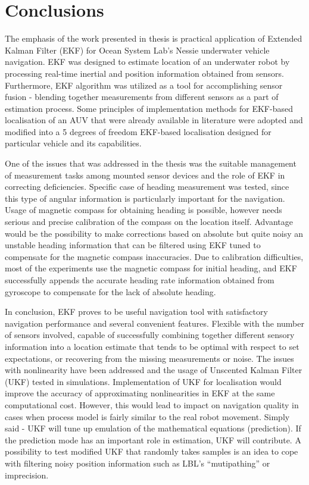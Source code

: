 \chapter{Conclusions} \label{chap:conclusions}
The emphasis of the work presented in thesis is practical application of Extended Kalman Filter (EKF) for Ocean System Lab's Nessie underwater vehicle navigation. EKF was designed to estimate location of an underwater robot by processing real-time inertial and position information obtained from sensors. Furthermore, EKF algorithm was utilized as a tool for accomplishing sensor fusion - blending together measurements from different sensors as a part of estimation process. Some principles of implementation methods for EKF-based localisation of an AUV that were already available in literature were adopted and modified into a 5 degrees of freedom EKF-based localisation designed for particular vehicle and its capabilities.  

One of the issues that was addressed in the thesis was the suitable management of measurement tasks among mounted sensor devices and the role of EKF in correcting deficiencies. Specific case of heading measurement was tested, since this type of angular information is particularly important for the navigation. Usage of magnetic compass for obtaining heading is possible, however needs serious and precise calibration of the compass on the location itself. Advantage would be the possibility to make corrections based on absolute but quite noisy an unstable heading information that can be filtered using EKF tuned to compensate for the magnetic compass inaccuracies. Due to calibration difficulties, most of the experiments use the magnetic compass for initial heading, and EKF successfully appends the accurate heading rate information obtained from gyroscope to compensate for the lack of absolute heading. 

In conclusion, EKF proves to be useful navigation tool with satisfactory navigation performance and several convenient features. Flexible with the number of sensors involved, capable of successfully combining together different sensory information into a location estimate that tends to be optimal with respect to set expectations, or recovering from the missing measurements or noise. The issues with nonlinearity have been addressed and the usage of Unscented Kalman Filter (UKF) tested in simulations. Implementation of UKF for localisation would improve the accuracy of approximating nonlinearities in EKF at the same computational cost. However, this would lead to impact on navigation quality in cases when process model is fairly similar to the real robot movement. Simply said - UKF will tune up emulation of the mathematical equations (prediction). If the prediction mode has an important role in estimation, UKF will contribute. A possibility to test modified UKF that randomly takes samples is an idea to cope with filtering noisy position information such as LBL's ``mutipathing'' or imprecision.      

